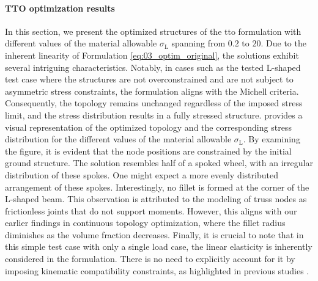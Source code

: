 \paragraph{TTO optimization results}
In this section, we present the optimized structures of the \gls{tto} formulation with different values of the material allowable $\sigma_\text{L}$ spanning from $0.2$ to $20$. Due to the inherent linearity of Formulation \ref{eq:03_optim_original}, the solutions exhibit several intriguing characteristics. Notably, in cases such as the tested L-shaped test case where the structures are not overconstrained and are not subject to asymmetric stress constraints, the formulation aligns with the Michell criteria. Consequently, the topology remains unchanged regardless of the imposed stress limit, and the stress distribution results in a fully stressed structure.  provides a visual representation of the optimized topology and the corresponding stress distribution for the different values of the material allowable $\sigma_\text{L}$. By examining the figure, it is evident that the node positions are constrained by the initial ground structure. The solution resembles half of a spoked wheel, with an irregular distribution of these spokes. One might expect a more evenly distributed arrangement of these spokes. Interestingly, no fillet is formed at the corner of the L-shaped beam. This observation is attributed to the modeling of truss nodes as frictionless joints that do not support moments. However, this aligns with our earlier findings in continuous topology optimization, where the fillet radius diminishes as the volume fraction decreases. Finally, it is crucial to note that in this simple test case with only a single load case, the linear elasticity is inherently considered in the formulation. There is no need to explicitly account for it by imposing kinematic compatibility constraints, as highlighted in previous studies .
